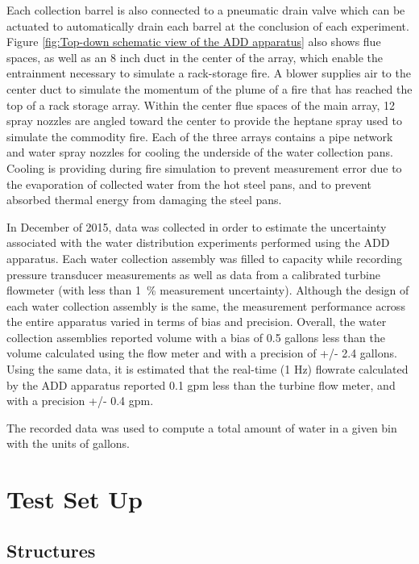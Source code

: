 \documentclass{article}
\begin{document}
\clearpage
 
Each collection barrel is also connected to a pneumatic drain valve which can be actuated to automatically drain each barrel at the conclusion of each experiment. Figure \ref{fig:Top-down schematic view of the ADD apparatus} also shows flue spaces, as well as an 8 inch duct in the center of the array, which enable the entrainment necessary to simulate a rack-storage fire. A blower supplies air to the center duct to simulate the momentum of the plume of a fire that has reached the top of a rack storage array. Within the center flue spaces of the main array, 12 spray nozzles are angled toward the center to provide the heptane spray used to simulate the commodity fire. Each of the three arrays contains a pipe network and water spray nozzles for cooling the underside of the water collection pans. Cooling is providing during fire simulation to prevent measurement error due to the evaporation of collected water from the hot steel pans, and to prevent absorbed thermal energy from damaging the steel pans.

In December of 2015, data was collected in order to estimate the uncertainty associated with the water distribution experiments performed using the ADD apparatus. Each water collection assembly was filled to capacity while recording pressure transducer measurements as well as data from a calibrated turbine flowmeter (with less than 1~\% measurement uncertainty).
Although the design of each water collection assembly is the same, the measurement performance across the entire apparatus varied in terms of bias and precision. Overall, the water collection assemblies reported volume with a bias of 0.5 gallons less than the volume calculated using the flow meter and with a precision of +/- 2.4 gallons. Using the same data, it is estimated that the real-time (1 Hz) flowrate calculated by the ADD apparatus reported 0.1 gpm less than the turbine flow meter, and with a precision +/- 0.4 gpm.

The recorded data was used to compute a total amount of water in a given bin with the units of gallons.

\clearpage

\section{Test Set Up}

\subsection{Structures}
\end{document}
